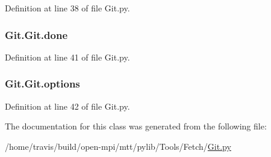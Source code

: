 Definition at line 38 of file Git.\-py.

\hypertarget{class_git_1_1_git_adb8991008d4bb4568fa9c2f991711cda}{
\subsubsection[{done}]{\setlength{\rightskip}{0pt plus 5cm}Git.\-Git.\-done}}\label{class_git_1_1_git_adb8991008d4bb4568fa9c2f991711cda}


Definition at line 41 of file Git.\-py.

\hypertarget{class_git_1_1_git_a7560b88b014c5da8785739c7bb6283ed}{
\subsubsection[{options}]{\setlength{\rightskip}{0pt plus 5cm}Git.\-Git.\-options}}\label{class_git_1_1_git_a7560b88b014c5da8785739c7bb6283ed}


Definition at line 42 of file Git.\-py.



The documentation for this class was generated from the following file\-:\begin{DoxyCompactItemize}
\item 
/home/travis/build/open-\/mpi/mtt/pylib/\-Tools/\-Fetch/\hyperlink{_git_8py}{Git.\-py}\end{DoxyCompactItemize}
